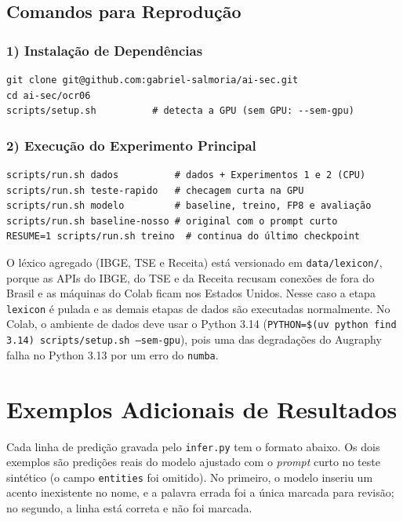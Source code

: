 \documentclass[12pt,a4paper]{article}
\begin{document}
\subsection{Comandos para Reprodução}

\subsubsection*{1) Instalação de Dependências}
\begin{verbatim}
git clone git@github.com:gabriel-salmoria/ai-sec.git
cd ai-sec/ocr06
scripts/setup.sh          # detecta a GPU (sem GPU: --sem-gpu)
\end{verbatim}

\subsubsection*{2) Execução do Experimento Principal}
\begin{verbatim}
scripts/run.sh dados          # dados + Experimentos 1 e 2 (CPU)
scripts/run.sh teste-rapido   # checagem curta na GPU
scripts/run.sh modelo         # baseline, treino, FP8 e avaliação
scripts/run.sh baseline-nosso # original com o prompt curto
RESUME=1 scripts/run.sh treino  # continua do último checkpoint
\end{verbatim}

O léxico agregado (IBGE, TSE e Receita) está versionado em \texttt{data/lexicon/}, porque as APIs do IBGE, do TSE e da Receita recusam conexões de fora do Brasil e as máquinas do Colab ficam nos Estados Unidos. Nesse caso a etapa \texttt{lexicon} é pulada e as demais etapas de dados são executadas normalmente. No Colab, o ambiente de dados deve usar o Python 3.14 (\texttt{PYTHON=\$(uv python find 3.14) scripts/setup.sh --sem-gpu}), pois uma das degradações do Augraphy falha no Python 3.13 por um erro do \texttt{numba}.

\section{Exemplos Adicionais de Resultados}
\label{app:exemplos}

Cada linha de predição gravada pelo \texttt{infer.py} tem o formato abaixo. Os dois exemplos são predições reais do modelo ajustado com o \emph{prompt} curto no teste sintético (o campo \texttt{entities} foi omitido). No primeiro, o modelo inseriu um acento inexistente no nome, e a palavra errada foi a única marcada para revisão; no segundo, a linha está correta e não foi marcada.
\end{document}
